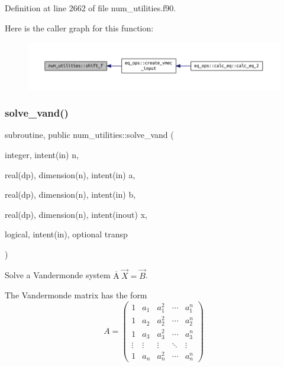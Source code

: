 Definition at line 2662 of file num\+\_\+utilities.\+f90.

Here is the caller graph for this function\+:
\nopagebreak
\begin{figure}[H]
\begin{center}
\leavevmode
\includegraphics[width=350pt]{namespacenum__utilities_ac887f1cc7176167b352dedbd22ff2a57_icgraph}
\end{center}
\end{figure}
\mbox{\label{namespacenum__utilities_a54c65e345182e2e7e13ac14a0ba3647a}} 
\subsubsection{\texorpdfstring{solve\+\_\+vand()}{solve\_vand()}}
{\footnotesize\ttfamily subroutine, public num\+\_\+utilities\+::solve\+\_\+vand (\begin{DoxyParamCaption}\item[{integer, intent(in)}]{n,  }\item[{real(dp), dimension(n), intent(in)}]{a,  }\item[{real(dp), dimension(n), intent(in)}]{b,  }\item[{real(dp), dimension(n), intent(inout)}]{x,  }\item[{logical, intent(in), optional}]{transp }\end{DoxyParamCaption})}



Solve a Vandermonde system $\overline{\text{A}} \ \vec{X} = \vec{B}$. 

The Vandermonde matrix has the form \[A = \left(\begin{array}{ccccc} 1 & a_1 & a_1^2 & \cdots & a_1^n \\ 1 & a_2 & a_2^2 & \cdots & a_2^n \\ 1 & a_3 & a_3^2 & \cdots & a_3^n \\ \vdots & \vdots & \vdots & \ddots & \vdots \\ 1 & a_n & a_n^2 & \cdots & a_n^n \end{array}\right)\]

